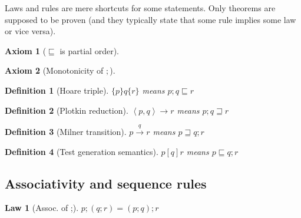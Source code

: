 \documentclass{article}
\begin{document}
\newcommand{\refines}{\sqsubseteq}
\newcommand{\refinedby}{\sqsupseteq}
\newcommand{\eps}{\varepsilon}

\newcommand{\verified}{{\color{green}Verified.}}

\renewenvironment{proof}{\tiny Proof.}{\qed}

\newcommand{\milner}[3]{#1\stackrel{#2}{\rightarrow}#3}

\newcommand{\plotkin}[3]{\left< #1, #2 \right> \rightarrow #3}


\newtheorem{axiom}{Axiom}
\newtheorem{law}{Law}
\newtheorem{rul}{Rule} %
\newtheorem{theorem}{Theorem}
\newtheorem{lemma}{Lemma}
\newtheorem{definition}{Definition}

Laws and rules are mere shortcuts for some statements.
Only theorems are supposed to be proven (and they typically state that
some rule implies some law or vice versa).


\begin{axiom} [$\refines$ is partial order]
\end{axiom}

\begin{axiom} [Monotonicity of $;$]
\end{axiom}


\begin{definition} [Hoare triple]
$\{p\}q\{r\}$ means $p;q \refines r$
\end{definition}

\begin{definition} [Plotkin reduction]
$\plotkin{p}{q}{r}$ means $p; q \refinedby r$
\end{definition}

\begin{definition} [Milner transition]
$\milner{p}{q}{r}$ means $p \refinedby q; r$
\end{definition}

\begin{definition} [Test generation semantics]
$p[q]r$ means $p \refines q;r$
\end{definition}


\subsection*{Associativity and sequence rules}

\begin{law}[Assoc. of ;]
$p;(q;r) = (p;q);r$
\end{law}
\end{document}
